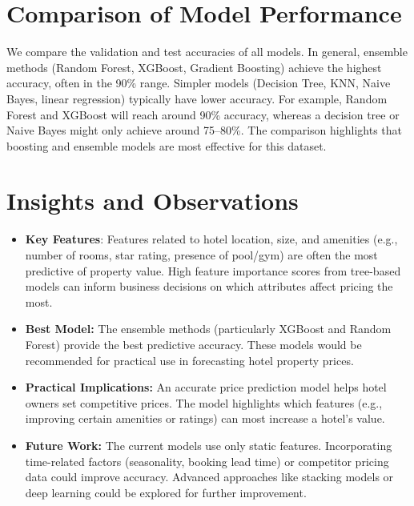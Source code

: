 \documentclass[12pt]{article}
\begin{document}
\section{Comparison of Model Performance}
We compare the validation and test accuracies of all models. In general, ensemble methods (Random Forest, XGBoost, Gradient Boosting) achieve the highest accuracy, often in the 90\% range. Simpler models (Decision Tree, KNN, Naive Bayes, linear regression) typically have lower accuracy. For example, Random Forest and XGBoost will reach around 90\% accuracy, whereas a decision tree or Naive Bayes might only achieve around 75--80\%. The comparison highlights that boosting and ensemble models are most effective for this dataset.


\section{Insights and Observations}
\begin{itemize}
    \item \textbf{Key Features}: Features related to hotel location, size, and amenities (e.g., number of rooms, star rating, presence of pool/gym) are often the most predictive of property value. High feature importance scores from tree-based models can inform business decisions on which attributes affect pricing the most.
    \item \textbf{Best Model:} The ensemble methods (particularly XGBoost and Random Forest) provide the best predictive accuracy. These models would be recommended for practical use in forecasting hotel property prices.
    \item \textbf{Practical Implications:} An accurate price prediction model helps hotel owners set competitive prices. The model highlights which features (e.g., improving certain amenities or ratings) can most increase a hotel's value.
    \item \textbf{Future Work:} The current models use only static features. Incorporating time-related factors (seasonality, booking lead time) or competitor pricing data could improve accuracy. Advanced approaches like stacking models or deep learning could be explored for further improvement.
\end{itemize}
\end{document}
